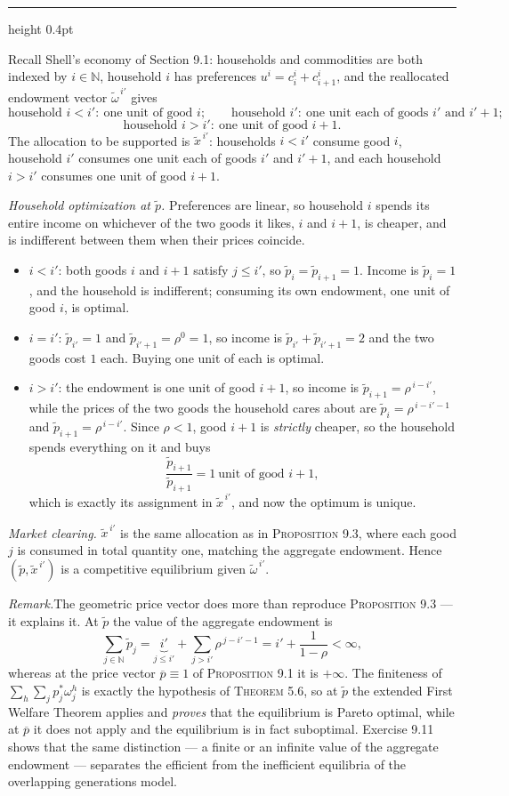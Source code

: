 \documentclass[11pt,letterpaper,reqno]{amsart}
\makeatletter
\newcommand{\N}{\mathbb{N}}
\newcommand{\wt}[1]{\widetilde{#1}}
\newcommand{\ol}[1]{\overline{#1}}
\newcommand{\as@head}[3]{%
  \par\addvspace{1.6ex}\penalty-200\relax
  \phantomsection
  \addcontentsline{toc}{subsection}{#1 #2\texorpdfstring{\ifx\relax#3\relax\else\quad #3\fi}{}}%
  {\color{RuleGrey}\hrule height 0.4pt}%
  \nobreak\vspace{0.8ex}\nobreak
  \noindent{\bfseries #1 #2}%
  \ifx\relax#3\relax\else\quad{\bfseries\itshape #3}\fi
  \par\nobreak\vspace{0.4ex}\nobreak
  \as@beginstatement
}
\newcommand{\as@beginstatement}{\begingroup\itshape\ignorespaces}
\newenvironment{aex}[2]{\as@head{Exercise}{#1}{#2}}{\par\addvspace{1.2ex}}
\newcommand{\rmk}[1]{%
  \par\vspace{0.6ex}%
  {\small\noindent\textit{Remark.}\hspace{0.5em}#1\par}%
  \vspace{0.4ex}%
}
\newcommand{\bk}[1]{\textup{\textsc{#1}}}
\renewcommand{\as@beginstatement}{\ignorespaces}
\makeatother
\begin{document}
\begin{aex}{9.2}{}
Recall Shell's economy of Section 9.1: households and commodities are both indexed by $i\in\N$,
household $i$ has preferences $u^{i}=c^{i}_{i}+c^{i}_{i+1}$, and the reallocated endowment vector
$\wt\omega^{\,i'}$ gives
\[
\text{household }i<i':\ \text{one unit of good }i;\qquad
\text{household }i':\ \text{one unit each of goods }i'\text{ and }i'+1;
\]
\[
\text{household }i>i':\ \text{one unit of good }i+1 .
\]
The allocation to be supported is $\wt x^{\,i'}$: households $i<i'$ consume good $i$, household
$i'$ consumes one unit each of goods $i'$ and $i'+1$, and each household $i>i'$ consumes one unit
of good $i+1$.

\emph{Household optimization at $\wt p$.}  Preferences are linear, so household $i$ spends its
entire income on whichever of the two goods it likes, $i$ and $i+1$, is cheaper, and is
indifferent between them when their prices coincide.
\begin{itemize}
\item $i<i'$: both goods $i$ and $i+1$ satisfy $j\le i'$, so $\wt p_i=\wt p_{i+1}=1$.  Income is
      $\wt p_i=1$, and the household is indifferent; consuming its own endowment, one unit of
      good $i$, is optimal.
\item $i=i'$: $\wt p_{i'}=1$ and $\wt p_{i'+1}=\rho^{0}=1$, so income is
      $\wt p_{i'}+\wt p_{i'+1}=2$ and the two goods cost $1$ each.  Buying one unit of each is
      optimal.
\item $i>i'$: the endowment is one unit of good $i+1$, so income is
      $\wt p_{i+1}=\rho^{\,i-i'}$, while the prices of the two goods the household cares about
      are $\wt p_{i}=\rho^{\,i-i'-1}$ and $\wt p_{i+1}=\rho^{\,i-i'}$.  Since $\rho<1$, good
      $i+1$ is \emph{strictly} cheaper, so the household spends everything on it and buys
      \[
      \frac{\wt p_{i+1}}{\wt p_{i+1}}=1\ \text{unit of good }i+1,
      \]
      which is exactly its assignment in $\wt x^{\,i'}$, and now the optimum is unique.
\end{itemize}

\emph{Market clearing.}  $\wt x^{\,i'}$ is the same allocation as in \bk{Proposition 9.3}, where
each good $j$ is consumed in total quantity one, matching the aggregate endowment.  Hence
$(\wt p,\wt x^{\,i'})$ is a competitive equilibrium given $\wt\omega^{\,i'}$.

\rmk{The geometric price vector does more than reproduce \bk{Proposition 9.3} --- it explains it.
At $\wt p$ the value of the aggregate endowment is
\[
\sum_{j\in\N}\wt p_j=\underbrace{i'}_{j\le i'}+\sum_{j>i'}\rho^{\,j-i'-1}
=i'+\frac{1}{1-\rho}<\infty ,
\]
whereas at the price vector $\ol p\equiv1$ of \bk{Proposition 9.1} it is $+\infty$.  The finiteness
of $\sum_{h}\sum_{j}p^{*}_{j}\omega^{h}_{j}$ is exactly the hypothesis of \bk{Theorem 5.6}, so at
$\wt p$ the extended First Welfare Theorem applies and \emph{proves} that the equilibrium is
Pareto optimal, while at $\ol p$ it does not apply and the equilibrium is in fact suboptimal.
Exercise 9.11 shows that the same distinction --- a finite or an infinite value of the aggregate
endowment --- separates the efficient from the inefficient equilibria of the overlapping
generations model.}
\end{aex}
\end{document}

